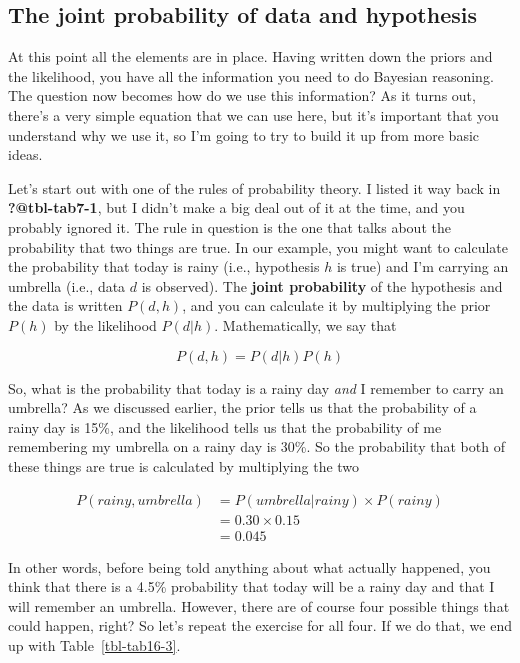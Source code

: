 \documentclass[
  a4paper,
]{book}
\begin{document}
\hypertarget{the-joint-probability-of-data-and-hypothesis}{%
\subsection{The joint probability of data and
hypothesis}\label{the-joint-probability-of-data-and-hypothesis}}

At this point all the elements are in place. Having written down the
priors and the likelihood, you have all the information you need to do
Bayesian reasoning. The question now becomes how do we use this
information? As it turns out, there's a very simple equation that we can
use here, but it's important that you understand why we use it, so I'm
going to try to build it up from more basic ideas.

Let's start out with one of the rules of probability theory. I listed it
way back in \textbf{?@tbl-tab7-1}, but I didn't make a big deal out of
it at the time, and you probably ignored it. The rule in question is the
one that talks about the probability that two things are true. In our
example, you might want to calculate the probability that today is rainy
(i.e., hypothesis \(h\) is true) and I'm carrying an umbrella (i.e.,
data \(d\) is observed). The \textbf{joint probability} of the
hypothesis and the data is written \(P(d,h)\), and you can calculate it
by multiplying the prior \(P(h)\) by the likelihood \(P(d|h)\).
Mathematically, we say that

\[P(d,h)=P(d|h)P(h)\]

So, what is the probability that today is a rainy day \emph{and} I
remember to carry an umbrella? As we discussed earlier, the prior tells
us that the probability of a rainy day is 15\%, and the likelihood tells
us that the probability of me remembering my umbrella on a rainy day is
30\%. So the probability that both of these things are true is
calculated by multiplying the two

\[
\begin{split}
P(rainy, umbrella) & = P(umbrella|rainy) \times P(rainy) \\
& = 0.30 \times 0.15 \\
& = 0.045
\end{split}
\]

In other words, before being told anything about what actually happened,
you think that there is a 4.5\% probability that today will be a rainy
day and that I will remember an umbrella. However, there are of course
four possible things that could happen, right? So let's repeat the
exercise for all four. If we do that, we end up with
Table~\ref{tbl-tab16-3}.
\end{document}
